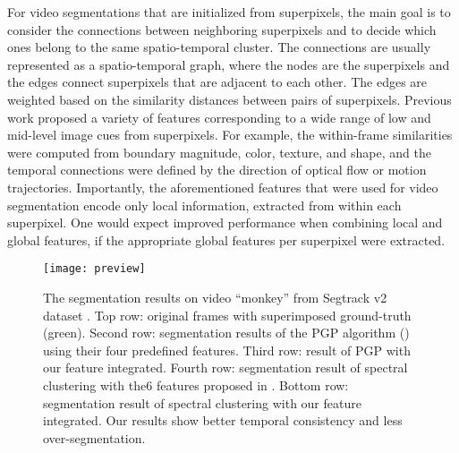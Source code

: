 \documentclass[runningheads]{llncs}
\begin{document}
For video segmentations that are initialized from superpixels, the main goal is to consider the connections between neighboring superpixels and to decide which ones belong to the same spatio-temporal cluster. The connections are usually represented as a spatio-temporal graph, where the nodes are the superpixels and the edges connect superpixels that are adjacent to each other. The edges are weighted based on the similarity distances between pairs of superpixels. Previous work \cite{Khoreva:7298697,Grundmann:5539893} proposed a variety of features corresponding to a wide range of low and mid-level image cues from superpixels. For example, the within-frame similarities were computed from boundary magnitude, color, texture, and shape, and the temporal connections were defined by the direction of optical flow or motion trajectories.  
Importantly, the aforementioned features that were used for video segmentation encode only local information, extracted from within each superpixel. One would expect improved performance when combining local and global features, if the appropriate global features per superpixel were extracted.

\begin{figure}[!t]
\begin{center}
\texttt{[image: preview]}
\end{center}
\caption{The segmentation results on video ``monkey'' from Segtrack v2 dataset \cite{SegTrackv2_dataset}. Top row: original frames with superimposed ground-truth (green). Second row: segmentation results of the PGP algorithm (\cite{Yu_2015_ICCV}) using their four predefined features. Third row: result of PGP with our feature integrated. Fourth row: segmentation result of spectral clustering with the6 features proposed in \cite{Galasso2013}. Bottom row: segmentation result of spectral clustering with our feature integrated. Our results show better temporal consistency and less over-segmentation.}
\label{fig:preview}
\end{figure}
\end{document}

